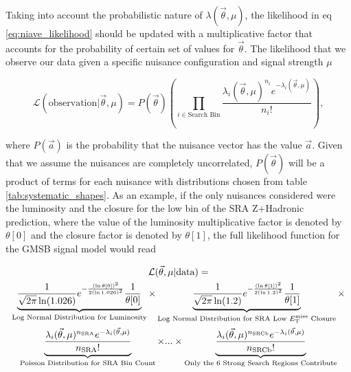       Taking into account the probabilistic nature of $\lambda(\vec{\theta}, \mu)$, the likelihood in eq \ref{eq:niave_likelihood} should be updated with a multiplicative factor that accounts for the probability of certain set of values for $\vec{\theta}$. The likelihood that we observe our data given a specific nuisance configuration and signal strength $\mu$

      \begin{equation} 
        \mathcal{L}(\text{observation} | \vec{\theta}, \mu ) = P(\vec{\theta}) \left( \prod_{i \in \text{Search Bin}} \frac{\lambda_i(\vec{\theta}, \mu)^{n_i} e^{-\lambda_i(\vec{\theta}, \mu)}}{n_i !} \right), \label{eq:true_likelihood}
      \end{equation}
      

      where $P(\vec{a})$ is the probability that the nuisance vector has the value $\vec{a}$. Given that we assume the nuisances are completely uncorrelated, $P(\vec{\theta})$ will be a product of terms for each nuisance with distributions chosen from table \ref{tab:systematic_shapes}. As an example, if the only nuisances considered were the luminosity and the closure for the low \MET bin of the SRA Z+Hadronic prediction, where the value of the luminosity multiplicative factor is denoted by $\theta[0]$ and the closure factor is denoted by $\theta[1]$, the full likelihood function for the GMSB signal model would read

      \begin{multline}
          \mathcal{L}(\vec{\theta}, \mu | \text{data} ) = \\
          \underbrace{\frac{1}{\sqrt{2\pi} \ln(1.026)} e^{-\frac{\left(\ln\theta[0]\right)^2}{2 \left(\ln 1.026\right)^2}} \frac{1}{\theta[0]}}_{\text{Log Normal Distribution for Luminosity}} \times \underbrace{\frac{1}{\sqrt{2\pi} \ln(1.2)} e^{-\frac{\left(\ln\theta[1]\right)^2}{2 \left(\ln 1.2\right)^2}} \frac{1}{\theta[1]}}_{\text{Log Normal Distribution for SRA Low \MET Closure}} \times \\
          \underbrace{\frac{\lambda_i(\vec{\theta}, \mu)^{n_{\text{SRA}}} e^{-\lambda_i(\vec{\theta}, \mu)}}{n_{\text{SRA}} !}}_{\text{Poisson Distribution for SRA Bin Count}} \times ... \times \underbrace{\frac{\lambda_i(\vec{\theta}, \mu)^{n_{\text{SRCb}}} e^{-\lambda_i(\vec{\theta}, \mu)}}{n_{\text{SRCb}} !}}_{\text{Only the 6 Strong Search Regions Contribute}}
      \end{multline}



